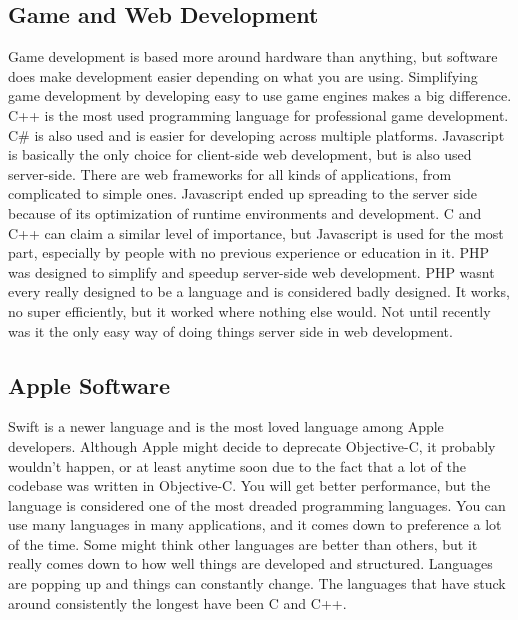 \documentclass[letterpaper, 10 pt, conference]{IEEEtran}
\begin{document}
\subsection{Game and Web Development}
\indent Game development is based more around hardware than anything, but software does make development easier depending on what you are using. Simplifying game development by developing easy to use game engines makes a big difference. C++ is the most used programming language for professional game development. C\# is also used and is easier for developing across multiple platforms.  Javascript is basically the only choice for client-side web development, but is also used server-side. There are web frameworks for all kinds of applications, from complicated to simple ones. Javascript ended up spreading to the server side because of its optimization of runtime environments and development. C and C++ can claim a similar level of importance, but Javascript is used for the most part, especially by people with no previous experience or education in it. PHP was designed to simplify and speedup server-side web development. PHP wasnt every really designed to be a language and is considered badly designed. It works, no super efficiently, but it worked where nothing else would. Not until recently was it the only easy way of doing things server side in web development.
\newline
\subsection{Apple Software}
\indent Swift is a newer language and is the most loved language among Apple developers. Although Apple might decide to deprecate  Objective-C, it probably wouldn't happen, or at least anytime soon due to the fact that a lot of the codebase was written in Objective-C. You will get better performance, but the language is considered one of the most dreaded programming languages.
\newline
\indent You can use many languages in many applications, and it comes down to preference a lot of the time. Some might think other languages are better than others, but it really comes down to how well things are developed and structured. Languages are popping up and things can constantly change. The languages that have stuck around consistently the longest have been C and C++.
\end{document}
